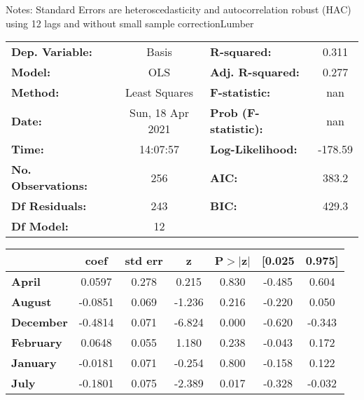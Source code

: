 Notes: \newline
 [1] Standard Errors are heteroscedasticity and autocorrelation robust (HAC) using 12 lags and without small sample correctionLumber\begin{center}
\begin{tabular}{lclc}
\toprule
\textbf{Dep. Variable:}    &      Basis       & \textbf{  R-squared:         } &     0.311   \\
\textbf{Model:}            &       OLS        & \textbf{  Adj. R-squared:    } &     0.277   \\
\textbf{Method:}           &  Least Squares   & \textbf{  F-statistic:       } &       nan   \\
\textbf{Date:}             & Sun, 18 Apr 2021 & \textbf{  Prob (F-statistic):} &      nan    \\
\textbf{Time:}             &     14:07:57     & \textbf{  Log-Likelihood:    } &   -178.59   \\
\textbf{No. Observations:} &         256      & \textbf{  AIC:               } &     383.2   \\
\textbf{Df Residuals:}     &         243      & \textbf{  BIC:               } &     429.3   \\
\textbf{Df Model:}         &          12      & \textbf{                     } &             \\
\bottomrule
\end{tabular}
\begin{tabular}{lcccccc}
                   & \textbf{coef} & \textbf{std err} & \textbf{z} & \textbf{P$> |$z$|$} & \textbf{[0.025} & \textbf{0.975]}  \\
\midrule
\textbf{April}     &       0.0597  &        0.278     &     0.215  &         0.830        &       -0.485    &        0.604     \\
\textbf{August}    &      -0.0851  &        0.069     &    -1.236  &         0.216        &       -0.220    &        0.050     \\
\textbf{December}  &      -0.4814  &        0.071     &    -6.824  &         0.000        &       -0.620    &       -0.343     \\
\textbf{February}  &       0.0648  &        0.055     &     1.180  &         0.238        &       -0.043    &        0.172     \\
\textbf{January}   &      -0.0181  &        0.071     &    -0.254  &         0.800        &       -0.158    &        0.122     \\
\textbf{July}      &      -0.1801  &        0.075     &    -2.389  &         0.017        &       -0.328    &       -0.032     \\

\end{tabular}
\end{center}
